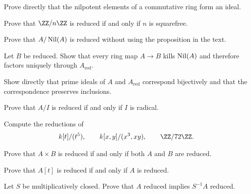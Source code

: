 \begin{exercise}
Prove directly that the nilpotent elements of a commutative ring form an ideal.
\end{exercise}

\begin{exercise}
Prove that $\ZZ/n\ZZ$ is reduced if and only if $n$ is squarefree.
\end{exercise}

\begin{exercise}
Prove that $A/\operatorname{Nil}(A)$ is reduced without using the proposition in the text.
\end{exercise}

\begin{exercise}
Let $B$ be reduced.  Show that every ring map $A\to B$ kills $\operatorname{Nil}(A)$ and therefore factors
uniquely through $A_{\mathrm{red}}$.
\end{exercise}

\begin{exercise}
Show directly that prime ideals of $A$ and $A_{\mathrm{red}}$ correspond bijectively and
that the correspondence preserves inclusions.
\end{exercise}

\begin{exercise}
Prove that $A/I$ is reduced if and only if $I$ is radical.
\end{exercise}

\begin{exercise}
Compute the reductions of
\[
k[t]/(t^5),\qquad
k[x,y]/(x^3,xy),\qquad
\ZZ/72\ZZ.
\]
\end{exercise}

\begin{exercise}[Products]
Prove that $A\times B$ is reduced if and only if both $A$ and $B$ are reduced.
\end{exercise}

\begin{exercise}
Prove that $A[t]$ is reduced if and only if $A$ is reduced.
\end{exercise}

\begin{exercise}
Let $S$ be multiplicatively closed.  Prove that $A$ reduced implies $S^{-1}A$ reduced.
\end{exercise}

